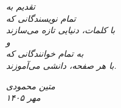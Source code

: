 
\thispagestyle{empty}
\vspace*{5cm}

\begin{flushright}
    {\Large\itshape
        تقدیم به\\
        تمام نویسندگانی که\\
        با کلمات، دنیایی تازه می‌سازند\\
        و\\
        به تمام خوانندگانی که\\
        با هر صفحه، دانشی می‌آموزند.
    }
\end{flushright}

\vfill

\begin{flushleft}
    {\large\itshape
        متین محمودی\\
        مهر ۱۴۰۵
    }
\end{flushleft}

\clearpage